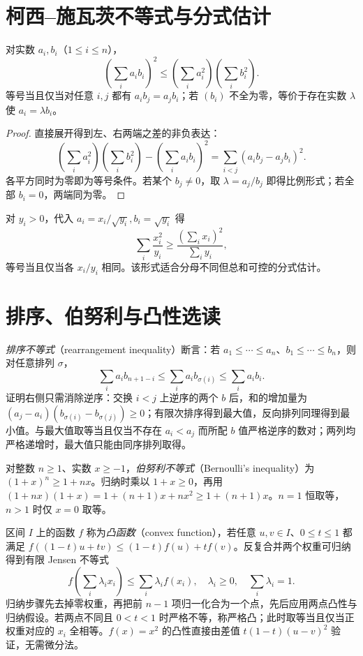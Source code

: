 \section{柯西--施瓦茨不等式与分式估计}
\begin{theorem}[柯西--施瓦茨不等式]
对实数 $a_i,b_i$（$1\le i\le n$），
\begin{equation}\label{eq:em-cauchy}
 \left(\sum_i a_ib_i\right)^2\le
 \left(\sum_i a_i^2\right)\left(\sum_i b_i^2\right).
\end{equation}
等号当且仅当对任意 $i,j$ 都有 $a_ib_j=a_jb_i$；若 $(b_i)$ 不全为零，等价于存在实数 $\lambda$ 使 $a_i=\lambda b_i$。
\end{theorem}
\begin{proof}
直接展开得到左、右两端之差的非负表达：
\[
 \left(\sum_i a_i^2\right)\left(\sum_i b_i^2\right)
 -\left(\sum_i a_ib_i\right)^2
 =\sum_{i<j}(a_ib_j-a_jb_i)^2.
\]
各平方同时为零即为等号条件。若某个 $b_j\ne0$，取 $\lambda=a_j/b_j$ 即得比例形式；若全部 $b_i=0$，两端同为零。
\end{proof}
对 $y_i>0$，代入 $a_i=x_i/\sqrt{y_i},b_i=\sqrt{y_i}$ 得
\[
 \sum_i\frac{x_i^2}{y_i}\ge\frac{(\sum_i x_i)^2}{\sum_i y_i},
\]
等号当且仅当各 $x_i/y_i$ 相同。该形式适合分母不同但总和可控的分式估计。

\section{排序、伯努利与凸性选读}
\emph{排序不等式}（rearrangement inequality）断言：若 $a_1\le\cdots\le a_n$、$b_1\le\cdots\le b_n$，则对任意排列 $\sigma$，
\[
 \sum_i a_ib_{n+1-i}\le\sum_i a_ib_{\sigma(i)}\le\sum_i a_ib_i.
\]
证明右侧只需消除逆序：交换 $i<j$ 上逆序的两个 $b$ 后，和的增加量为 $(a_j-a_i)(b_{\sigma(i)}-b_{\sigma(j)})\ge0$；有限次排序得到最大值，反向排列同理得到最小值。与最大值取等当且仅当不存在 $a_i<a_j$ 而所配 $b$ 值严格逆序的数对；两列均严格递增时，最大值只能由同序排列取得。

对整数 $n\ge1$、实数 $x\ge-1$，\emph{伯努利不等式}（Bernoulli's inequality）为 $(1+x)^n\ge1+nx$。归纳时乘以 $1+x\ge0$，再用
$(1+nx)(1+x)=1+(n+1)x+nx^2\ge1+(n+1)x$。$n=1$ 恒取等，$n>1$ 时仅 $x=0$ 取等。

区间 $I$ 上的函数 $f$ 称为\emph{凸函数}（convex function），若任意 $u,v\in I$、$0\le t\le1$ 都满足
$f((1-t)u+tv)\le(1-t)f(u)+tf(v)$。反复合并两个权重可归纳得到有限 Jensen 不等式
\[
 f\left(\sum_i\lambda_i x_i\right)\le\sum_i\lambda_i f(x_i),
 \quad \lambda_i\ge0,\quad\sum_i\lambda_i=1.
\]
归纳步骤先去掉零权重，再把前 $n-1$ 项归一化合为一个点，先后应用两点凸性与归纳假设。若两点不同且 $0<t<1$ 时严格不等，称严格凸；此时取等当且仅当正权重对应的 $x_i$ 全相等。$f(x)=x^2$ 的凸性直接由差值 $t(1-t)(u-v)^2$ 验证，无需微分法。

